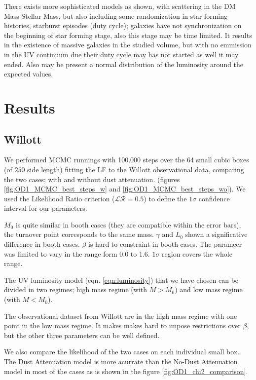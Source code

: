 \documentclass{emulateapj}
\newcommand{\hMpc}{{\ifmmode{h^{-1}{\rm Mpc}}\else{$h^{-1}$Mpc }\fi}}
\begin{document}
There exists more sophisticated models as \cite{Lee09} shown, with scattering in 
the DM Mass-Stellar Mass, but also including some 
randomization in star forming histories, starburst episodes (duty cycle); 
galaxies have not synchronization on the beginning of star forming stage, also
this stage may be time limited. It results in the existence of massive galaxies
in the studied volume, but with no emmission in the UV continuum due their
duty cycle may has not started as well it may ended. Also may be present a
normal distribution of the luminosity around the expected values.

\section{Results}
\label{sec:results}

\subsection{Willott}

We performed MCMC runnings with 100.000 steps over the 64 small 
cubic boxes (of $250$ \hMpc side length) fitting the LF to the 
Willott observational data, comparing the two cases; with and 
without dust attenuation. (figures \ref{fig:OD1_MCMC_best_steps_w} and 
\ref{fig:OD1_MCMC_best_steps_wo}). 
We used the Likelihood Ratio criterion ($\mathcal{LR}= 0.5$) to
define the $1\sigma$ confidence interval for our parameters.

$M_0$ is quite similar in booth cases (they are compatible within 
the error bars), the turnover point corresponds to the same mass.
$\gamma$ and $L_0$ shown a significative difference in booth cases.
$\beta$ is hard to constraint in booth cases. 
The parameer was limited to vary in the range form 0.0 to 1.6. 
$1\sigma$ region covers the whole range.

The UV luminosity model (eqn. \ref{eqn:luminosity}) that we have 
chosen can be divided in two regimes; high mass regime 
(with $M > M_0$) and low mass regime (with $M < M_0$).

The observational dataset from Willott are in the high mass regime 
with one point in the low mass regime. It makes makes hard to impose
restrictions over $\beta$, but the other three parameters can be
well defined.

We also compare the likelihood of the two cases on each individual 
small box. The Dust Attenuation model is more acurrate than the
No-Dust Attenuation model in most of the cases as is shown in the figure 
\ref{fig:OD1_chi2_comparison}.
\end{document}
